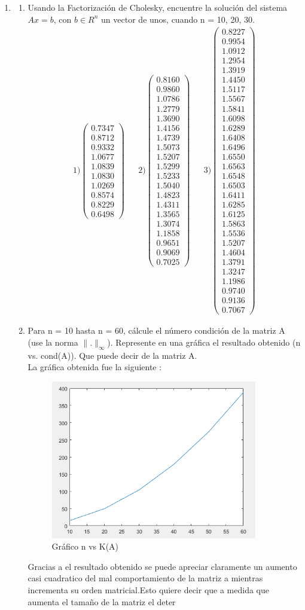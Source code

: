 \documentclass{udpreport}
\providecommand{\norm}[1]{\lVert#1\rVert}
\begin{document}
\begin{enumerate}
 	
 	\item 
 	 \begin {enumerate}
 	    \item Usando la Factorización de Cholesky, encuentre la solución del sistema $Ax = b$, con $b \in R^{n}$  un vector de unos, cuando n = 10, 20, 30.
 	        \begin{align*}
 	             1) \left(\begin{array}{c} 0.7347\\ 0.8712\\ 0.9332\\ 1.0677\\ 1.0839\\ 1.0830\\ 1.0269\\ 0.8574\\ 0.8229\\ 0.6498 \end{array}\right) 	 &&   2) \left(\begin{array}{c} 0.8160\\ 0.9860\\ 1.0786\\ 1.2779\\ 1.3690\\ 1.4156\\ 1.4739\\ 1.5073\\ 1.5207\\ 1.5299\\ 1.5233\\ 1.5040\\ 1.4823\\ 1.4311\\ 1.3565\\ 1.3074\\ 1.1858\\ 0.9651\\ 0.9069\\ 0.7025 \end{array}\right)   &&  3) \left(\begin{array}{c} 0.8227\\ 0.9954\\ 1.0912\\ 1.2954\\ 1.3919\\ 1.4450\\ 1.5117\\ 1.5567\\ 1.5841\\ 1.6098\\ 1.6289\\ 1.6408\\ 1.6496\\ 1.6550\\ 1.6563\\ 1.6548\\ 1.6503\\ 1.6411\\ 1.6285\\ 1.6125\\ 1.5863\\ 1.5536\\ 1.5207\\ 1.4604\\ 1.3791\\ 1.3247\\ 1.1986\\ 0.9740\\ 0.9136\\ 0.7067 \end{array}\right) 
 	        \end{align*}
	        
 	        \item Para n = 10 hasta n = 60, cálcule el número condición de la matriz A (use la norma $\norm{.}_{\infty}$). Represente en una gráfica el resultado obtenido (n vs. cond(A)). Que puede decir de la matriz A.\\
 	        
 	        La gráfica obtenida fue la siguiente :
            \begin{figure}[H]
                \centering
                \includegraphics[width=9cm]{Grafico2b}
                \caption{Gráfico n vs K(A)} \label{fig:Grafico2b}
            \end{figure}
            
            Gracias a el resultado obtenido se puede apreciar claramente un aumento casi cuadratico del mal comportamiento de la matriz a mientras incrementa su orden matricial.Esto quiere decir que a medida que aumenta el tamaño de la matriz el deter
\end{enumerate}
\end{enumerate}
\end{document}
